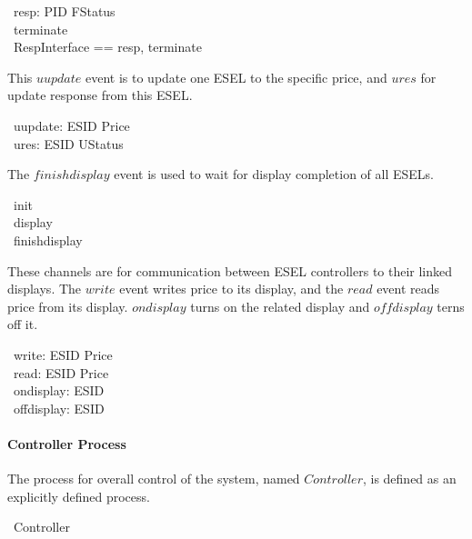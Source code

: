 \begin{circus}
	\circchannel\ resp: PID \cross FStatus \\
    \circchannel\ terminate \\
    \circchannelset\ RespInterface == \lchanset resp, terminate \rchanset 
\end{circus}

This $uupdate$ event is to update one ESEL to the specific price, and $ures$ for update response from this ESEL.
\begin{circus}
	\circchannel\ uupdate: ESID \cross Price \\
	\circchannel\ ures: ESID \cross UStatus
\end{circus}

The $finishdisplay$ event is used to wait for display completion of all ESELs.
\begin{circus}
	\circchannel\ init \\
	\circchannel\ display \\
	\circchannel\ finishdisplay
\end{circus}

These channels are for communication between ESEL controllers to their linked displays. The $write$ event writes price to its display, and the $read$ event reads price from its display. $ondisplay$ turns on the related display and $offdisplay$ terns off it.
\begin{circus}
	\circchannel\ write: ESID \cross Price \\
	\circchannel\ read: ESID \cross Price \\
	\circchannel\ ondisplay: ESID \\
	\circchannel\ offdisplay: ESID 
\end{circus}

\paragraph{Controller Process}
The process for overall control of the system, named $Controller$, is defined as an explicitly defined process.

\begin{circus}
	\circprocess\ Controller \circdef \circbegin \\
\end{circus}

